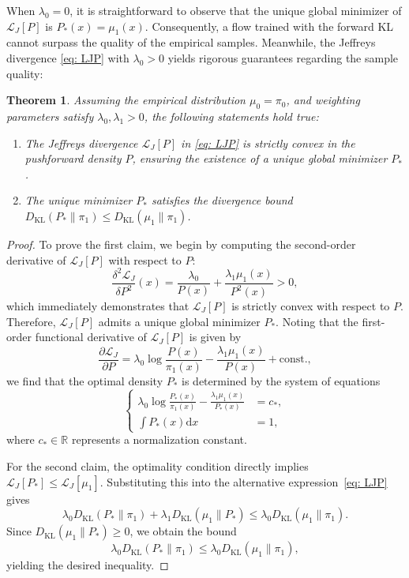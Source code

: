 \documentclass[%
 reprint,
 amsmath,amssymb,
 aps,
 pre,
]{revtex4-2}
\newtheorem{theorem}{Theorem}
\DeclareMathOperator{\KL}{KL}
\newcommand{\D}{\mathrm{d}}
\newcommand{\Ge}{\geqslant}
\newcommand{\Le}{\leqslant}
\begin{document}
When $\lambda_0 = 0$, it is straightforward to observe that the unique global minimizer of $\mathcal L_J[P]$ is $P_*(x) = \mu_1(x)$. Consequently, a flow trained with the forward KL cannot surpass the quality of the empirical samples. Meanwhile, the Jeffreys divergence \eqref{eq: LJP} with $\lambda_0>0$ yields rigorous guarantees regarding the sample quality:
\begin{theorem}
\label{theorem: correct}
Assuming the empirical distribution $\mu_0 = \pi_0$, and weighting parameters satisfy $\lambda_0, \lambda_1 > 0$, the following statements hold true:
\begin{enumerate}
	\setlength{\itemsep}{4pt}
	\item The Jeffreys divergence $\mathcal L_J[P]$ in \eqref{eq: LJP} is strictly convex in the pushforward density $P$, ensuring the existence of a unique global minimizer $P_*$.
	\item The unique minimizer $P_*$ satisfies the divergence bound $D_{\KL}(P_*\|\pi_1 ) \Le D_{\KL}(\mu_1\|\pi_1)$.
\end{enumerate}
\end{theorem}
\mbox{}
\begin{proof}
To prove the first claim, we begin by computing the second-order derivative of $\mathcal L_J[P]$ with respect to $P$:
\begin{equation*}
	\frac{\delta^2 \mathcal L_J}{\delta P^2}(x) = \frac{\lambda_0}{P(x)} + 
	\frac{\lambda_1 \mu_1(x)}{P^2(x)} > 0,
\end{equation*}
which immediately demonstrates that $\mathcal L_J[P]$ is strictly convex with respect to $P$. Therefore, $\mathcal L_J[P]$ admits a unique global minimizer $P_*$. Noting that the first-order functional derivative of $\mathcal L_J[P]$ is given by
\begin{equation*}
	\frac{\partial \mathcal L_J}{\partial P} = \lambda_0 \log \frac{P(x)}{\pi_1(x)}
	- \frac{\lambda_1 \mu_1(x)}{P(x)} + \mathrm{const.},
\end{equation*}
we find that the optimal density $P_*$ is determined by the system of equations
\begin{equation*}
\left\{
\begin{aligned}
	\lambda_0 \log \frac{P_*(x)}{\pi_1(x)}
	- \frac{\lambda_1 \mu_1(x)}{P_*(x)} & = c_*, \\
	\int P_*(x) \D x & = 1,
\end{aligned}
\right.
\end{equation*}
where $c_*\in\mathbb R$ represents a normalization constant. 

For the second claim, the optimality condition directly implies $\mathcal L_J[P_*] \Le \mathcal L_J[\mu_1]$. Substituting this into the alternative expression~\eqref{eq: LJP} gives
\begin{equation*}
\lambda_0 D_{\KL}(P_*\|\pi_1) + \lambda_1 D_{\KL}(\mu_1\|P_*) \Le 
\lambda_0 D_{\KL}(\mu_1\|\pi_1 ).
\end{equation*}
Since $D_{\KL}(\mu_1\|P_*)\Ge 0$, we obtain the bound
\begin{equation*}
	\lambda_0 D_{\KL}(P_*\|\pi_1) \Le 
	\lambda_0 D_{\KL}(\mu_1\|\pi_1 ),
\end{equation*}
yielding the desired inequality.
\end{proof}
\end{document}
